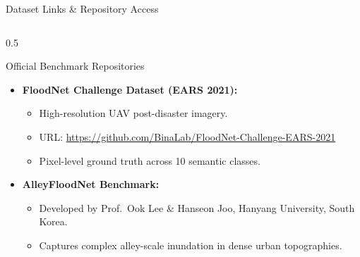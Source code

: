 \documentclass[aspectratio=169, 10pt, professionalfonts]{beamer}
\begin{document}
\begin{frame}{Dataset Links \& Repository Access}
  \begin{columns}[T]
    \begin{column}{0.5\textwidth}
      \begin{block}{Official Benchmark Repositories}
        \begin{itemize}\setlength{\itemsep}{0.6em}\footnotesize
          \item \textbf{FloodNet Challenge Dataset (EARS 2021):}
            \begin{itemize}\scriptsize
              \item High-resolution UAV post-disaster imagery.
              \item URL: \url{https://github.com/BinaLab/FloodNet-Challenge-EARS-2021}
              \item Pixel-level ground truth across 10 semantic classes.
            \end{itemize}
          \item \textbf{AlleyFloodNet Benchmark:}
            \begin{itemize}\scriptsize
              \item Developed by Prof.~Ook Lee \& Hanseon Joo, Hanyang University, South Korea.
              \item Captures complex alley-scale inundation in dense urban topographies.
            \end{itemize}
        \end{itemize}
      \end{block}
    \end{column}
    

\end{columns}
\end{frame}
\end{document}
